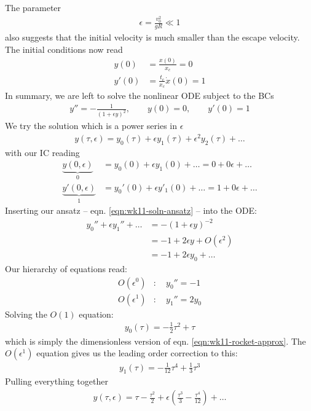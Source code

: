 The parameter
\begin{gather*}
	\epsilon = \frac{v_0^2}{gR} \ll 1
\end{gather*}
also suggests that the initial velocity is much smaller than the escape velocity. The initial conditions now read
\begin{align*}
	y(0) &= \frac{x(0)}{x_c} = 0 \\
	y'(0) &= \frac{t_c}{x_c} \dot{x}(0) = 1
\end{align*}
In summary, we are left to solve the nonlinear ODE subject to the BCs
\begin{gather}
	y'' = -\frac{1}{(1+ \epsilon y)^2}, \qquad 
	y(0) = 0, \qquad y'(0) = 1 \label{eqn:wk11-example1-ode}
\end{gather}
We try the solution which is a power series in $\epsilon$
\begin{gather}
	y(\tau,\epsilon) = y_0(\tau) + \epsilon y_1(\tau) + \epsilon^2 y_2(\tau) + \dots \label{eqn:wk11-soln-ansatz}
\end{gather}
with our IC reading
\begin{align*}
	\underbrace{y(0,\epsilon)}_0 &= y_0(0) + \epsilon y_1(0) + \dots = 0 + 0 \epsilon + \dots \\
	\underbrace{y'(0,\epsilon)}_1 &= y_0'(0) + \epsilon y'_1(0) + \dots = 1 + 0 \epsilon + \dots 
\end{align*}
Inserting our ansatz -- eqn. \ref{eqn:wk11-soln-ansatz} -- into the ODE:
\begin{align*}
	y_0'' + \epsilon y_1'' + \dots &= -(1+ \epsilon y)^{-2} \\
	&= -1 + 2\epsilon y + O(\epsilon^2) \\
	&= -1 + 2\epsilon y_0 + \dots 
\end{align*}
Our hierarchy of equations read:
\begin{align*}
	O(\epsilon^0) &: \quad y_0'' = -1 \\
	O(\epsilon^1) &: \quad y_1'' = 2y_0
\end{align*}
Solving the $O(1)$ equation:
\begin{gather*}
	y_0(\tau) = -\frac{1}{2}\tau^2 + \tau 
\end{gather*}
which is simply the dimensionless version of eqn. \ref{eqn:wk11-rocket-approx}. The $O(\epsilon^1)$ equation gives us the leading order correction to this:
\begin{gather*}
	y_1(\tau) = -\frac{1}{12} \tau^4 + \frac{1}{3} \tau^3
\end{gather*}
Pulling everything together
\begin{gather}
	y(\tau,\epsilon) = \tau -\frac{\tau^2}{2} + \epsilon \left(\frac{\tau^3}{3} - \frac{\tau^4}{12}\right) + \dots \label{eqn:wk11-rocket-correction}
\end{gather}
